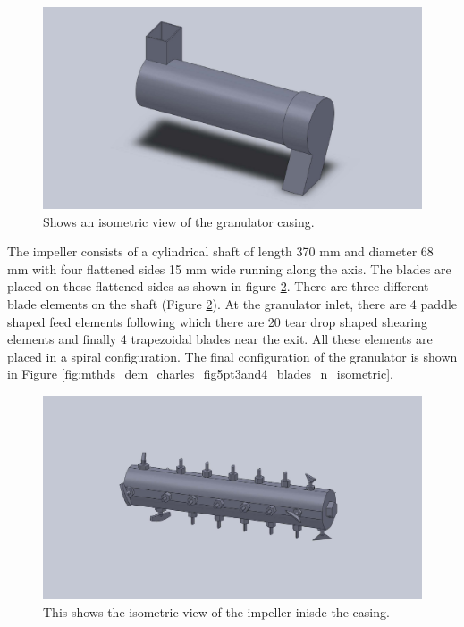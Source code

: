 \documentclass[preprint,11pt,authoryear]{elsarticle}
\begin{document}
\begin{figure}[H]
\centering
\includegraphics[scale=0.2]{shell_final_pic.pdf}
\caption{ Shows an isometric view of the granulator casing.}
\label{fig:mthdsDemCharlesGranShell}
\end{figure}

  The impeller consists of a cylindrical shaft of length 370 mm and diameter 68 mm with four 
flattened sides 15 mm wide running along the axis. The blades are placed on these flattened sides as 
shown in figure \ref{fig:mthds_dem_charles_impeller}. There are three different blade elements on the 
shaft (Figure \ref{fig:mthds_dem_charles_impeller}). At the granulator inlet, there are 4 paddle shaped 
feed elements following which there are 20 tear drop shaped shearing elements  and finally 4 
trapezoidal blades near the exit. All these elements are placed in a spiral configuration. The final 
configuration of the granulator is shown in Figure 
\ref{fig:mthds_dem_charles_fig5pt3and4_blades_n_isometric}.

\begin{figure}[H]
\centering
\includegraphics[scale=0.2]{impeller_final_pic.pdf}
\caption{This shows the isometric view of the impeller inisde the casing.}
\label{fig:mthds_dem_charles_impeller}
\end{figure}    
\end{document}

